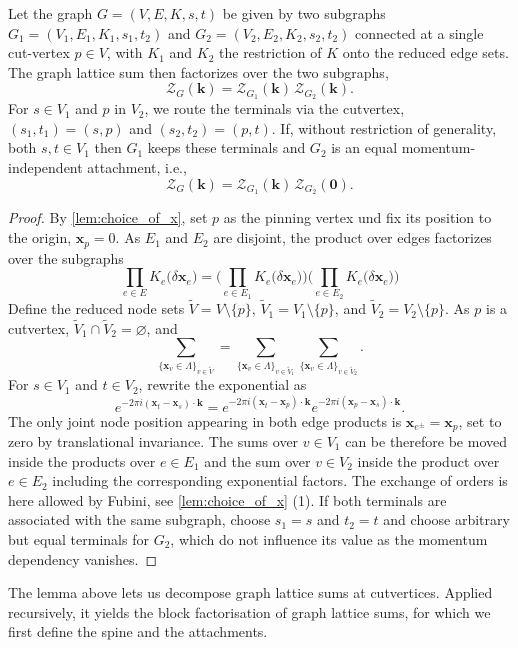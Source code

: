\documentclass[]{amsart}
\numberwithin{mythm}{section}
\begin{document}
\begin{lemma}
Let the graph $G=(V,E,K,s,t)$ be given by two subgraphs $G_1=(V_1,E_1,K_1,s_1,t_2)$ and $G_2=(V_2,E_2,K_2,s_2,t_2)$ connected at a single cut-vertex $p\in V$, with $K_1$ and $K_2$ the restriction of $K$ onto the reduced edge sets. The graph lattice sum then factorizes over the two subgraphs,
\[
\mathcal Z_G(\bm k)=\mathcal Z_{G_1}(\bm k)\,\mathcal Z_{G_2}(\bm k).
\]
For $s\in V_1$ and $p$ in $V_2$, we route the terminals via the cutvertex, $(s_1,t_1)=(s,p)$ and $(s_2,t_2)=(p,t)$. If, without restriction of generality, both $s,t\in V_1$ then $G_1$ keeps these terminals and $G_2$ is an equal momentum-independent attachment, i.e.,
 \[
\mathcal Z_G(\bm k)=\mathcal Z_{G_1}(\bm k)\,\mathcal Z_{G_2}(\bm 0).
\]
\end{lemma}
\begin{proof}
    By \cref{lem:choice_of_x}, set $p$ as the pinning vertex und fix its position to the origin, $\bm x_p=0$. 
    As $E_1$ and $E_2$ are disjoint, the product over edges factorizes over the subgraphs
    \[
    \prod_{e\in E} {K}_{e}\big(\delta\bm x_e\big)= 
    \bigg(\prod_{e\in E_1} {K}_{e}\big(\delta\bm x_e)\bigg)\bigg(\prod_{e\in E_2}{K}_{e}\big(\delta\bm x_e)\bigg)
    \]
    Define the reduced node sets $\tilde V=V\setminus \{p\}$, $\tilde V_1=V_1\setminus\{p\}$, and $\tilde V_2=V_2\setminus \{p\}$. As $p$ is a cutvertex, $\tilde V_1\cap\tilde V_2 =\varnothing$, and 
    \[
    \sum_{\{\bm x_{v}\in\Lambda\}_{v\in \tilde V}}=\sum_{\{\bm x_{v}\in\Lambda\}_{v\in \tilde V_1}} \sum_{\{\bm x_{v}\in\Lambda\}_{v\in \tilde V_2}}.
    \]
    For $s\in V_1$ and $t\in V_2$, rewrite the exponential as 
    \[
    e^{-2\pi i (\bm x_t-\bm x_s)\cdot \bm k} = e^{-2\pi i (\bm x_t-\bm x_p)\cdot \bm k}e^{-2\pi i (\bm x_p-\bm x_s)\cdot \bm k}.
    \]
    The only joint node position appearing in both edge products is $\bm x_{e^\pm}=\bm x_p$, set to zero by translational invariance. The sums over $v\in V_1$ can be therefore be moved inside the products over $e\in E_1$ and the sum over $v\in V_2$ inside the product over $e\in E_2$ including the corresponding exponential factors. The exchange of orders is here allowed by Fubini, see \cref{lem:choice_of_x} (1). If both terminals are associated with the same subgraph, choose $s_1=s$ and $t_2=t$ and choose arbitrary but equal terminals for $G_2$, which do not influence its value as the momentum dependency vanishes.
\end{proof}

The lemma above lets us decompose graph lattice sums at cutvertices. Applied recursively, it yields the block factorisation of graph lattice sums, for which we first define the spine and the attachments.
\end{document}
